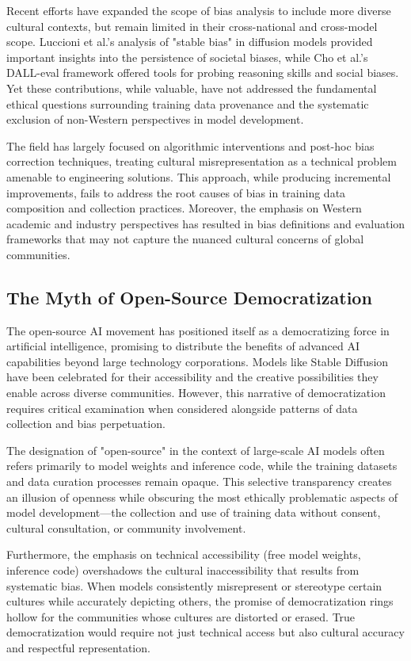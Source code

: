 \documentclass{article}
\begin{document}
Recent efforts have expanded the scope of bias analysis to include more diverse cultural contexts, but remain limited in their cross-national and cross-model scope. Luccioni et al.'s analysis of "stable bias" in diffusion models provided important insights into the persistence of societal biases, while Cho et al.'s DALL-eval framework offered tools for probing reasoning skills and social biases. Yet these contributions, while valuable, have not addressed the fundamental ethical questions surrounding training data provenance and the systematic exclusion of non-Western perspectives in model development.

The field has largely focused on algorithmic interventions and post-hoc bias correction techniques, treating cultural misrepresentation as a technical problem amenable to engineering solutions. This approach, while producing incremental improvements, fails to address the root causes of bias in training data composition and collection practices. Moreover, the emphasis on Western academic and industry perspectives has resulted in bias definitions and evaluation frameworks that may not capture the nuanced cultural concerns of global communities.

\subsection{The Myth of Open-Source Democratization}

The open-source AI movement has positioned itself as a democratizing force in artificial intelligence, promising to distribute the benefits of advanced AI capabilities beyond large technology corporations. Models like Stable Diffusion have been celebrated for their accessibility and the creative possibilities they enable across diverse communities. However, this narrative of democratization requires critical examination when considered alongside patterns of data collection and bias perpetuation.

The designation of "open-source" in the context of large-scale AI models often refers primarily to model weights and inference code, while the training datasets and data curation processes remain opaque. This selective transparency creates an illusion of openness while obscuring the most ethically problematic aspects of model development—the collection and use of training data without consent, cultural consultation, or community involvement.

Furthermore, the emphasis on technical accessibility (free model weights, inference code) overshadows the cultural inaccessibility that results from systematic bias. When models consistently misrepresent or stereotype certain cultures while accurately depicting others, the promise of democratization rings hollow for the communities whose cultures are distorted or erased. True democratization would require not just technical access but also cultural accuracy and respectful representation.
\end{document}
